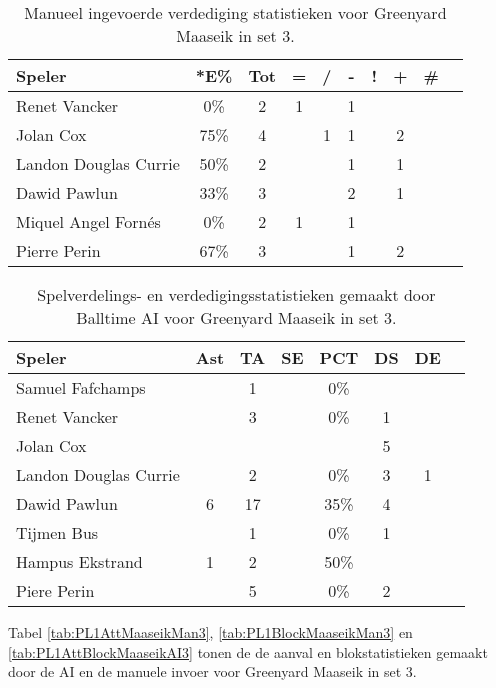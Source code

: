 \begin{table}[ht!]
    \centering
    \scriptsize
    \begin{tabular}{|l|c|c|c|c|c|c|c|c|c|} \hline
        \textbf{Speler} & *E\% & Tot & = & / & - & ! & + & \#\\ \hline
        Renet Vancker & 0\% & 2 & 1 &  & 1 &  &  &  \\ 
        Jolan Cox & 75\% & 4 &  & 1 & 1 &  & 2 &  \\ 
        Landon Douglas Currie & 50\% & 2 &  &  & 1 &  & 1 &  \\ 
        Dawid Pawlun & 33\% & 3 &  &  & 2 &  & 1 &  \\ 
        Miquel Angel Fornés & 0\% & 2 & 1 &  & 1 &  &  &  \\ 
        Pierre Perin & 67\% & 3 &  &  & 1 &  & 2 &  \\ \hline
    \end{tabular}
    \caption[Manueel ingevoerde verdedigingsstatistieken voor Greenyard Maaseik in set 3]{\label{tab:PL1DigMaaseikMan3}Manueel ingevoerde verdediging statistieken voor Greenyard Maaseik in set 3.}
\end{table}

\begin{table}[ht!]
  \centering
  \scriptsize
  \begin{tabular}{|l|c|c|c|c|c|c|c|} \hline
    \textbf{Speler} & Ast & TA & SE & PCT & DS & DE \\ \hline
    Samuel Fafchamps &  & 1 &  & 0\% &  &  \\
    Renet Vancker &  & 3 &  & 0\% & 1 &  \\
    Jolan Cox &  &  &  &  &  5 &  \\
    Landon Douglas Currie &  & 2 &  & 0\% & 3 & 1 \\
    Dawid Pawlun & 6 & 17 &  & 35\% & 4 &  \\
    Tijmen Bus &  & 1 &  & 0\% & 1 &  \\
    Hampus Ekstrand & 1 & 2 & & 50\% &  &  \\
    Piere Perin &  & 5 &  & 0\% & 2 &  \\  \hline
  \end{tabular}
  \caption[Spelverdelings- en verdedigingsstatistieken gemaakt door Balltime AI voor Greenyard Maaseik in set 3]{\label{tab:PL1SetDigMaaseikAI3}Spelverdelings- en verdedigingsstatistieken gemaakt door Balltime AI voor Greenyard Maaseik in set 3.}
\end{table}

Tabel \ref{tab:PL1AttMaaseikMan3}, \ref{tab:PL1BlockMaaseikMan3} en \ref{tab:PL1AttBlockMaaseikAI3} tonen de de aanval en blokstatistieken gemaakt door de AI en de manuele invoer voor Greenyard Maaseik in set 3. 

